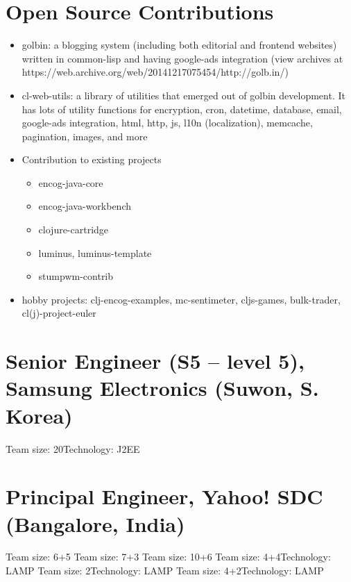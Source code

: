 \documentclass[11pt,a4paper,sans]{moderncv} %
\begin{document}
\section{Open Source Contributions}
         {\begin{itemize}
           \item golbin: a blogging system (including both editorial and frontend websites) written in common-lisp and having google-ads integration (view archives at https://web.archive.org/web/20141217075454/http://golb.in/)
           \item cl-web-utils: a library of utilities that emerged out of golbin development. It has lots of utility functions for encryption, cron, datetime, database, email, google-ads integration, html, http, js, l10n (localization), memcache, pagination, images, and more
           \item Contribution to existing projects
             \begin{itemize}
             \item encog-java-core
             \item encog-java-workbench
             \item clojure-cartridge
             \item luminus, luminus-template
             \item stumpwm-contrib
             \end{itemize}
           \item hobby projects: clj-encog-examples, mc-sentimeter, cljs-games, bulk-trader, cl(j)-project-euler
         \end{itemize}}

\section{Senior Engineer (S5 -- level 5), Samsung Electronics (Suwon, S. Korea)}
         {Team size: 20}{Technology: J2EE}
         {}

\section{Principal Engineer, Yahoo! SDC (Bangalore, India)}
         {Team size: 6+5}{}
         {}
         {Team size: 7+3}{}
         {}
         {Team size: 10+6}{}
         {}
         {Team size: 4+4}{Technology: LAMP}{}
         {Team size: 2}{Technology: LAMP}{}
         {Team size: 4+2}{Technology: LAMP}{}
\end{document}
